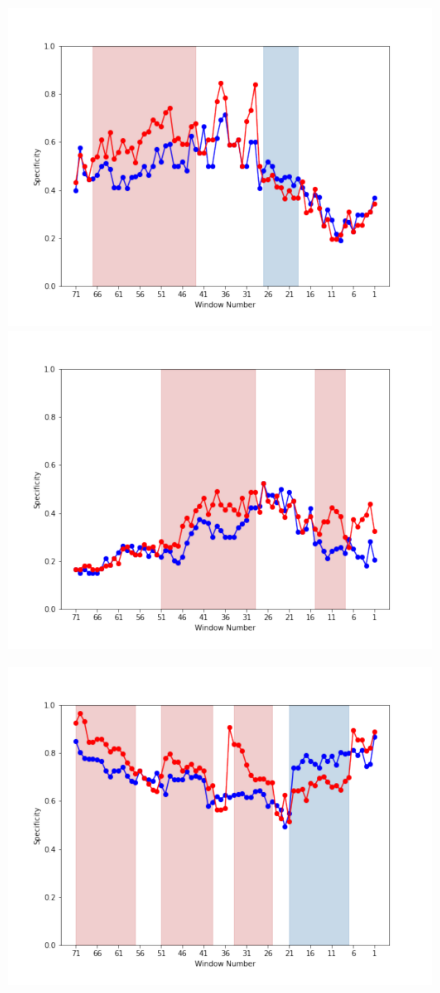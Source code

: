 \documentclass[submit]{ipsj}
\begin{document}
\begin{figure}[t]
\begin{minipage}[b]{0.65\columnwidth}
    \includegraphics[width=1\columnwidth]{Uenaka_fig/RQ2_result/Cinder/Cinder_review_Specificity.pdf}
    \includegraphics[width=1\columnwidth]{Uenaka_fig/RQ2_result/Keystone/Keystone_review_Specificity.pdf}
\end{minipage}
\begin{minipage}[b]{0.65\columnwidth}
    \centering
    \includegraphics[width=1\columnwidth]{Uenaka_fig/RQ2_result/Swift/Swift_review_Specificity.pdf}

\end{minipage}
\end{figure}
\end{document}
